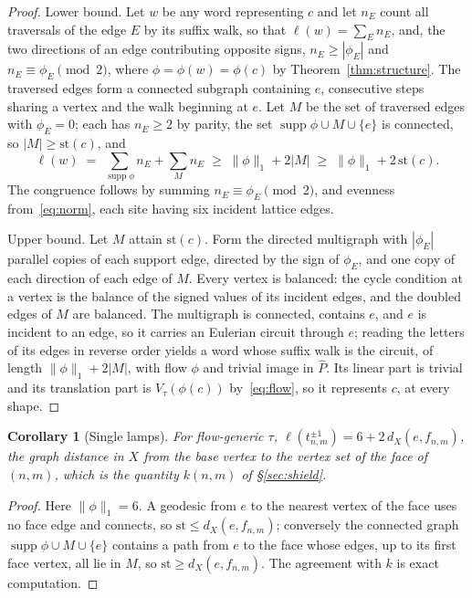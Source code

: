 \documentclass[11pt]{article}
\newtheorem{corollary}[theorem]{Corollary}
\theoremstyle{definition}
\theoremstyle{remark}
\begin{document}
\begin{proof}
Lower bound. Let $w$ be any word representing $c$ and let $n_E$ count all
traversals of the edge $E$ by its suffix walk, so that $\ell(w)=\sum_E n_E$,
and, the two directions of an edge contributing opposite signs,
$n_E\ge|\phi_E|$ and $n_E\equiv\phi_E\pmod2$, where $\phi=\phi(w)=\phi(c)$
by Theorem~\ref{thm:structure}. The traversed edges form a connected
subgraph containing $e$, consecutive steps sharing a vertex and the walk
beginning at $e$. Let $M$ be the set of traversed edges with $\phi_E=0$;
each has $n_E\ge2$ by parity, the set
$\operatorname{supp}\phi\cup M\cup\{e\}$ is connected, so
$|M|\ge\mathrm{st}(c)$, and
\[
 \ell(w)\;=\;\sum_{\operatorname{supp}\phi}n_E+\sum_{M}n_E
 \;\ge\;\|\phi\|_1+2|M|\;\ge\;\|\phi\|_1+2\,\mathrm{st}(c).
\]
The congruence follows by summing $n_E\equiv\phi_E\pmod2$, and evenness
from~\eqref{eq:norm}, each site having six incident lattice edges.

Upper bound. Let $M$ attain $\mathrm{st}(c)$. Form the directed multigraph
with $|\phi_E|$ parallel copies of each support edge, directed by the sign
of $\phi_E$, and one copy of each direction of each edge of $M$. Every
vertex is balanced: the cycle condition at a vertex is the balance of the
signed values of its incident edges, and the doubled edges of $M$ are
balanced. The multigraph is connected, contains $e$, and $e$ is incident to
an edge, so it carries an Eulerian circuit through $e$; reading the letters
of its edges in reverse order yields a word whose suffix walk is the
circuit, of length $\|\phi\|_1+2|M|$, with flow $\phi$ and trivial image in
$\widehat P$. Its linear part is trivial and its translation part is
$V_\tau(\phi(c))$ by~\eqref{eq:flow}, so it represents $c$, at every shape.
\end{proof}

\begin{corollary}[Single lamps]\label{cor:single}
For flow-generic $\tau$,
$\ell(t_{n,m}^{\pm1})=6+2\,d_X(e,f_{n,m})$, the graph distance in $X$ from
the base vertex to the vertex set of the face of $(n,m)$, which is the
quantity $k(n,m)$ of \S\ref{sec:shield}.
\end{corollary}

\begin{proof}
Here $\|\phi\|_1=6$. A geodesic from $e$ to the nearest vertex of the face
uses no face edge and connects, so $\mathrm{st}\le d_X(e,f_{n,m})$;
conversely the connected graph $\operatorname{supp}\phi\cup M\cup\{e\}$
contains a path from $e$ to the face whose edges, up to its first face
vertex, all lie in $M$, so $\mathrm{st}\ge d_X(e,f_{n,m})$. The agreement with $k$ is exact
computation.
\end{proof}
\end{document}
